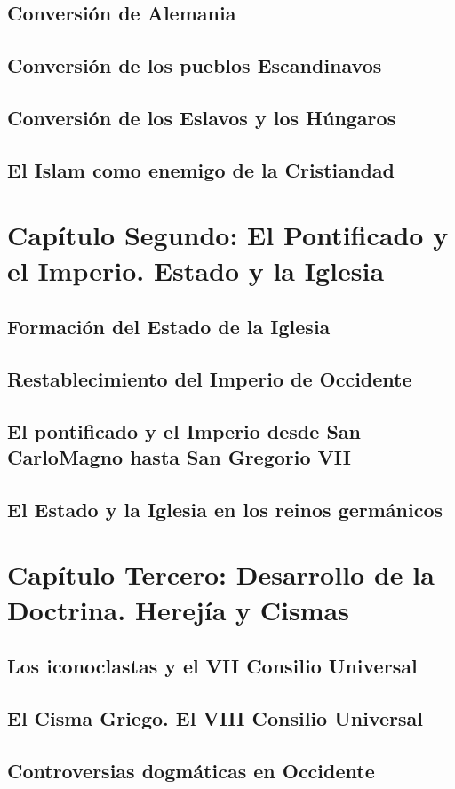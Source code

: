 \raggedbottom{} \documentclass[12pt, a4paper]{book}
\begin{document}
\section{Conversión de Alemania}
\section{Conversión de los pueblos Escandinavos}
\section{Conversión de los Eslavos y los Húngaros}
\section{El Islam como enemigo de la Cristiandad}
\chapter{Capítulo Segundo: El Pontificado y el Imperio. Estado y la Iglesia}
\section{Formación del Estado de la Iglesia}
\section{Restablecimiento del Imperio de Occidente}
\section{El pontificado y el Imperio desde San CarloMagno hasta San Gregorio VII}
\section{El Estado y la Iglesia en los reinos germánicos}
\chapter{Capítulo Tercero: Desarrollo de la Doctrina. Herejía y Cismas}
\section{Los iconoclastas y el VII Consilio Universal}
\section{El Cisma Griego. El VIII Consilio Universal}
\section{Controversias dogmáticas en Occidente}
\end{document}
